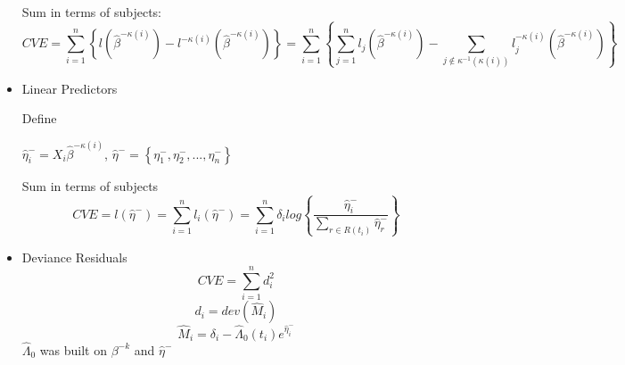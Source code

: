 \documentclass{article}
\begin{document}
\begin{itemize}
\par Sum in terms of subjects:
$$ CVE = \sum_{i = 1}^n \left\{ l(\hat{\beta}^{- \kappa(i)})  - l^{-\kappa(i)}(\hat{\beta}^{- \kappa(i)}) \right\}  =  \sum_{i = 1}^n \left\{ \sum_{j = 1}^n l_{j}(\hat{\beta}^{- \kappa(i)})  - \sum_{j \notin \kappa^{-1}(\kappa(i))} l_{j}^{-\kappa(i)}(\hat{\beta}^{- \kappa(i)}) \right\} $$

\item Linear Predictors
\par Define \par $\hat{\eta}^{-}_{i} = X_{i}\hat{\beta}^{-\kappa(i)}$, $\hat{\eta}^{-} = \left\{\eta_{1}^{-}, \eta_{2}^{-},..., \eta_{n}^{-} \right\}$

\par Sum in terms of subjects
$$ CVE = l(\hat{\eta}^{-}) = \sum_{i = 1}^n l_{i}(\hat{\eta}^{-}) = \sum_{i = 1}^n \delta_{i} log \left\{ \frac{\hat{\eta}_{i}^{-}}{\sum_{r \in R(t_{i})}\hat{\eta}_{r}^{-}} \right\}$$ 


\item Deviance Residuals
$$CVE = \sum_{i = 1}^{n}d_{i}^2 $$
$$d_{i} = dev(\hat{M}_{i})$$
$$\hat{M}_{i} = \delta_{i} - \hat{\Lambda}_{0}(t_{i})e^{\hat{\eta}_{i}^{-}}$$
$\hat{\Lambda}_{0}$ was built on $\beta^{-k}$ and $\hat{\eta}^{-}$


\end{itemize}
\end{document}
